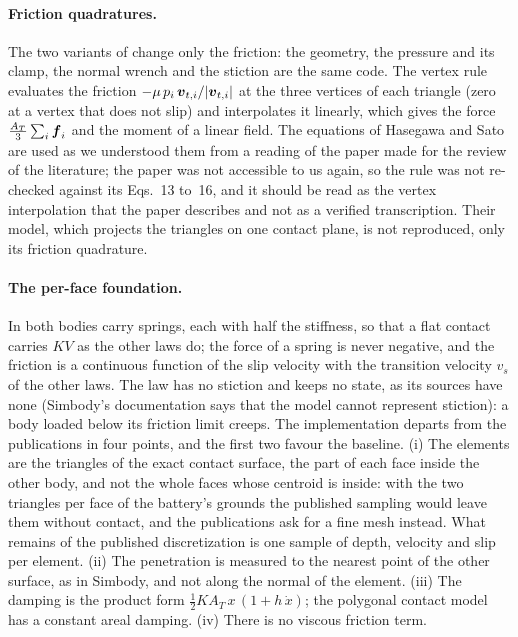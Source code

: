 \paragraph{Friction quadratures.} The two variants of  change only the
friction: the geometry, the pressure and its clamp, the normal wrench and the stiction are the
same code. The vertex rule evaluates the friction $-\mu\,p_i\,\boldsymbol{v}_{t,i}/|\boldsymbol{v}_{t,i}|$ at the
three vertices of each triangle (zero at a vertex that does not slip) and interpolates it
linearly, which gives the force $\tfrac{A_T}{3}\sum_i\boldsymbol{f}_i$ and the moment of a linear
field. The equations of Hasegawa and Sato \cite{Hasegawa2004} are used as we understood them
from a reading of the paper made for the review of the literature; the paper was not accessible
to us again, so the rule was not re-checked against its Eqs.~13 to~16, and it should be read as
the vertex interpolation that the paper describes and not as a verified transcription. Their
model, which projects the triangles on one contact plane, is not reproduced, only its friction
quadrature.

\paragraph{The per-face foundation.} In  both bodies carry springs, each with half the
stiffness, so that a flat contact carries $K V$ as the other laws do; the force of a spring is
never negative, and the friction is a continuous function of the slip velocity with the
transition velocity $v_s$ of the other laws. The law has no stiction and keeps no state, as its
sources have none (Simbody's documentation says that the model cannot represent stiction): a
body loaded below its friction limit creeps. The implementation departs from the publications
\cite{Hippmann2004,Hippmann2024,Sherman2011,SimbodyEFF} in four points, and the first two
favour the baseline. (i) The elements are the triangles of the exact contact surface, the part
of each face inside the other body, and not the whole faces whose centroid is inside: with the
two triangles per face of the battery's grounds the published sampling would leave them without
contact, and the publications ask for a fine mesh instead. What remains of the published
discretization is one sample of depth, velocity and slip per element. (ii) The penetration is
measured to the nearest point of the other surface, as in Simbody, and not along the normal of
the element. (iii) The damping is the product form $\tfrac12 K A_T\,x\,(1 + h\,\dot x)$; the
polygonal contact model has a constant areal damping. (iv) There is no viscous friction term.

